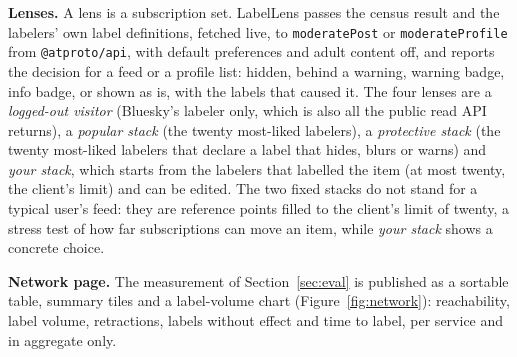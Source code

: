 \textbf{Lenses.} A lens is a subscription set. LabelLens passes the census result and the labelers' own label definitions, fetched live, to \texttt{moderatePost} or \texttt{moderateProfile} from \texttt{@atproto/api}, with default preferences and adult content off, and reports the decision for a feed or a profile list: hidden, behind a warning, warning badge, info badge, or shown as is, with the labels that caused it. The four lenses are a \emph{logged-out visitor} (Bluesky's labeler only, which is also all the public read API returns), a \emph{popular stack} (the twenty most-liked labelers), a \emph{protective stack} (the twenty most-liked labelers that declare a label that hides, blurs or warns) and \emph{your stack}, which starts from the labelers that labelled the item (at most twenty, the client's limit) and can be edited. The two fixed stacks do not stand for a typical user's feed: they are reference points filled to the client's limit of twenty, a stress test of how far subscriptions can move an item, while \emph{your stack} shows a concrete choice.

\textbf{Network page.} The measurement of Section~\ref{sec:eval} is published as a sortable table, summary tiles and a label-volume chart (Figure~\ref{fig:network}): reachability, label volume, retractions, labels without effect and time to label, per service and in aggregate only.

